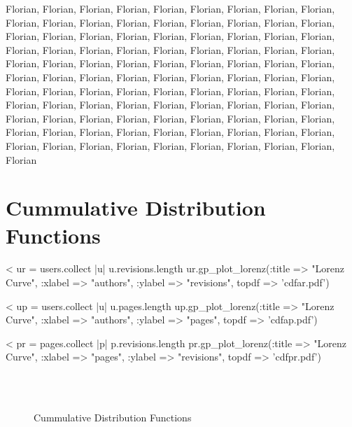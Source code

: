 \documentclass{scrartcl}
\begin{document}
Florian, Florian, Florian, Florian, Florian, Florian, Florian, Florian, Florian, Florian, Florian, Florian, Florian, Florian, Florian, Florian, Florian, Florian, Florian, Florian, Florian, Florian, Florian, Florian, Florian, Florian, Florian, Florian, Florian, Florian, Florian, Florian, Florian, Florian, Florian, Florian, Florian, Florian, Florian, Florian, Florian, Florian, Florian, Florian, Florian, Florian, Florian, Florian, Florian, Florian, Florian, Florian, Florian, Florian, Florian, Florian, Florian, Florian, Florian, Florian, Florian, Florian, Florian, Florian, Florian, Florian, Florian, Florian, Florian, Florian, Florian, Florian, Florian, Florian, Florian, Florian, Florian, Florian, Florian, Florian, Florian, Florian, Florian, Florian, Florian, Florian, Florian, Florian, Florian, Florian, Florian, Florian, Florian, Florian, Florian, Florian, Florian, Florian, Florian, Florian




\section{Cummulative Distribution Functions} %
\label{sec:cummulative_distribution_functions}

<%
ur = users.collect { |u| u.revisions.length }
ur.gp_plot_lorenz(:title => "Lorenz Curve", :xlabel => "authors", :ylabel => "revisions", topdf => 'cdfar.pdf')

<%
up = users.collect { |u| u.pages.length }
up.gp_plot_lorenz(:title => "Lorenz Curve", :xlabel => "authors", :ylabel => "pages", topdf => 'cdfap.pdf')

<%
pr = pages.collect { |p| p.revisions.length }
pr.gp_plot_lorenz(:title => "Lorenz Curve", :xlabel => "pages", :ylabel => "revisions", topdf => 'cdfpr.pdf')

\begin{figure}[htbp]
	\centering
	\\
	\\
	\caption{Cummulative Distribution Functions}
	\label{fig:cummulative_distribution_functions}
\end{figure}
\end{document}
